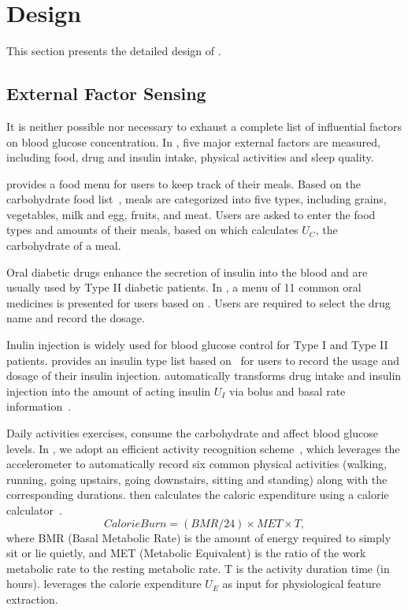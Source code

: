 
\section{Design}
\label{sec:design}
This section presents the detailed design of \sysname.

\subsection{External Factor Sensing}
\label{subsec:external}
It is neither possible nor necessary to exhaust a complete list of influential factors on blood glucose concentration.
In \sysname, five major external factors are measured, including food, drug and insulin intake, physical activities and sleep quality.

\sysname provides a food menu for users to keep track of their meals.
Based on the carbohydrate food list~\cite{bib:carblist}, meals are categorized into five types, including grains, vegetables, milk and egg, fruits, and meat.
Users are asked to enter the food types and amounts of their meals, based on which \sysname calculates $U_C$, the carbohydrate of a meal.

Oral diabetic drugs enhance the secretion of insulin into the blood and are usually used by Type II diabetic patients.
In \sysname, a menu of 11 common oral medicines is presented for users based on \cite{bib:druglist}.
Users are required to select the drug name and record the dosage.

Inulin injection is widely used for blood glucose control for Type I and Type II patients.
\sysname provides an insulin type list based on~\cite{bib:insulinlist} for users to record the usage and dosage of their insulin injection.
\sysname automatically transforms drug intake and insulin injection into the amount of acting insulin $U_I$ via bolus and basal rate information~\cite{bib:MAIHA14:Plis}.

Daily activities \eg exercises, consume the carbohydrate and affect blood glucose levels.
In \sysname, we adopt an efficient activity recognition scheme~\cite{bib:KDDEN11:Kwapisz}, which leverages the accelerometer to automatically record six common physical activities (walking, running, going upstairs, going downstairs, sitting and standing) along with the corresponding durations.
\sysname then calculates the caloric expenditure using a calorie calculator~\cite{bib:CalorieCounter}.
\begin{equation}\label{eq:calorie_burn}
  Calorie Burn = (BMR/24)\times MET \times T,
\end{equation}
where BMR (Basal Metabolic Rate) is the amount of energy required to simply sit or lie quietly, and MET (Metabolic Equivalent) is the ratio of the work metabolic rate to the resting metabolic rate.
T is the activity duration time (in hours).
\sysname leverages the calorie expenditure $U_E$ as input for physiological feature extraction.

